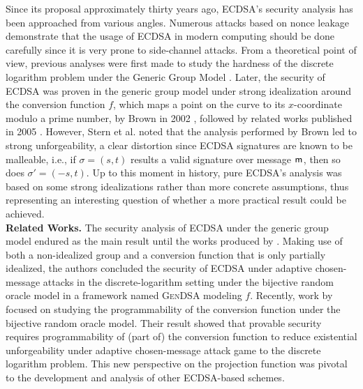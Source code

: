 \documentclass[version=submission, floatrow]{iacrcc}
\begin{document}
Since its proposal approximately thirty years ago, ECDSA's security analysis has been approached from various angles.
%
Numerous attacks based on nonce leakage \cite{Breitner2019, Granger2020, Aranha2020, Xu2023, Gao2025} demonstrate that the usage of ECDSA in modern computing should be done carefully since it is very prone to side-channel attacks.
%
From a theoretical point of view, previous analyses were first made to study the hardness of the discrete logarithm problem under the Generic Group Model \cite{Nechaev1994, Shoup1997, Brickell2000}.
%
Later, the security of ECDSA was proven in the generic group model under strong idealization around the conversion function $f$, which maps a point on the curve to its $x$-coordinate modulo a prime number, by Brown in 2002 \cite{Brown2002}, followed by related works published in 2005 \cite{Brown2005}. 
%
However, Stern et al. \cite{Stern02} noted that the analysis performed by Brown led to strong unforgeability, a clear distortion since ECDSA signatures are known to be malleable, i.e., if $\sigma = \left(s, t\right)$ results a valid signature over message $\mathsf{m}_{}$, then so does $\sigma' = \left(-s, t\right)$.
%
Up to this moment in history, pure ECDSA's analysis was based on some strong idealizations rather than more concrete assumptions, thus representing an interesting question of whether a more practical result could be achieved.\\

\noindent\textbf{Related Works.} The security analysis of ECDSA under the generic group model endured as the main result until the works produced by \cite{CCS:FerKilPoe16, Fersch2017}. 
%
Making use of both a non-idealized group and a conversion function that is only partially idealized, the authors concluded the security of ECDSA under adaptive chosen-message attacks in the discrete-logarithm setting under the bijective random oracle model in a framework named \textsc{GenDSA} modeling $f$.
%
Recently, work by \cite{Kiltz2023} focused on studying the programmability of the conversion function under the bijective random oracle model.
%
Their result showed that provable security requires programmability of (part of) the conversion function to reduce existential unforgeability under adaptive chosen-message attack game to the discrete logarithm problem. 
%
This new perspective on the projection function was pivotal to the development and analysis of other ECDSA-based schemes.
\end{document}
